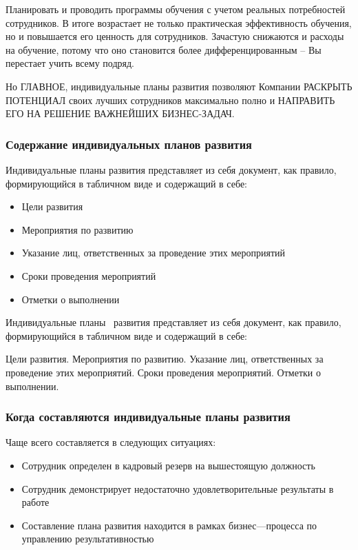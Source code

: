 \documentclass{../industrial-development}
\begin{document}
{	Планировать и проводить программы обучения с учетом реальных потребностей сотрудников. В итоге возрастает не только практическая эффективность обучения, но и повышается его ценность для сотрудников. Зачастую снижаются и расходы на обучение, потому что оно становится более дифференцированным – Вы перестает учить всему подряд.


Но ГЛАВНОЕ, индивидуальные планы развития позволяют Компании РАСКРЫТЬ ПОТЕНЦИАЛ своих лучших сотрудников максимально полно и НАПРАВИТЬ ЕГО НА РЕШЕНИЕ ВАЖНЕЙШИХ БИЗНЕС-ЗАДАЧ.

\begin{frame} \frametitle{Содержание индивидуальных планов развития}
  \begin{block}{ }
Индивидуальные планы развития представляет из себя документ, как правило, формирующийся в табличном виде и содержащий в себе:

  \end{block}
  
   \begin{itemize}
  \item Цели развития
  \item Мероприятия по развитию
  \item	 Указание лиц, ответственных за проведение этих мероприятий
 \item	Сроки проведения мероприятий
 \item	Отметки о выполнении
  \end{itemize}
\end{frame}

\lecturenotes
Индивидуальные планы~\cite{IPlan} развития представляет из себя документ, как правило, формирующийся в табличном виде и содержащий в себе:

  Цели развития.
 Мероприятия по развитию.
  Указание лиц, ответственных за проведение этих мероприятий.
 Сроки проведения мероприятий.
Отметки о выполнении.

\begin{frame} \frametitle{Когда составляются индивидуальные планы развития }
  \begin{block}{ }
Чаще всего составляется в следующих ситуациях:

  \end{block}
  
   \begin{itemize}
   только что принят на работу
  \item Сотрудник определен в кадровый резерв на вышестоящую должность
  \item	 Сотрудник демонстрирует недостаточно удовлетворительные результаты в работе
 \item	Составление плана развития находится в рамках бизнес---процесса по управлению результативностью
  \end{itemize}
\end{frame}

}
\end{document}
